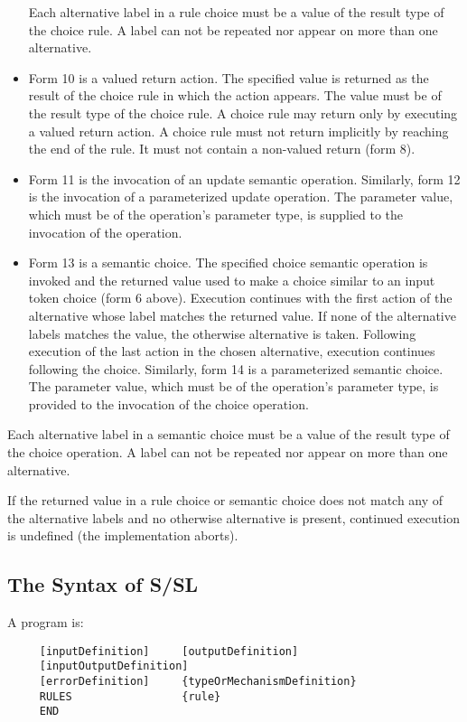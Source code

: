\begin{itemize}
Each     alternative  label in a rule choice must be a value
of the result type of the choice rule.  A label can  not  be
repeated nor appear on more than one alternative.
\item Form 10 is a valued return action.         The specified value
is returned as the result of the choice rule  in  which  the
action appears.  The value must be of the result type of the
choice rule.  A choice rule may return only by  executing  a
valued return action.  A choice rule must not return 
implicitly by reaching the end of the rule.  It must not contain a
non-valued return (form 8).
\item Form 11 is the invocation of an update semantic 
operation.  Similarly, form 12 is the invocation of a 
parameterized  update  operation.  The parameter value, which must be
of the operation's parameter type, is supplied to the  
invocation of the operation.
\item Form 13 is  a  semantic  choice.  The specified choice
semantic operation is invoked and the returned value used to
make  a  choice  similar  to an input token choice (form 6
above).  Execution continues with the first  action  of  the
alternative whose label matches the returned value.  If none
of the alternative labels matches the value,  the  otherwise
alternative  is  taken.   Following  execution  of  the last
action in the chosen alternative, execution  continues  
following       the  choice.  Similarly, form 14 is a parameterized
semantic choice.  The parameter value, which must be of  the
operation's parameter type, is provided to the invocation of
the choice operation.
\end{itemize}

Each alternative label in a semantic     choice  must  be  a
value  of  the result type of the choice operation.  A label
can not be repeated nor appear on more than one alternative.

If the returned value in a rule choice or semantic choice
does not match any of the alternative labels and  no  
otherwise  alternative  is  present, continued execution is 
undefined (the implementation aborts).




\subsection{The Syntax of S/SL}

A program is:
\begin{verbatim}
     [inputDefinition]     [outputDefinition]
     [inputOutputDefinition]
     [errorDefinition]     {typeOrMechanismDefinition}
     RULES                 {rule}                  
     END
\end{verbatim}


